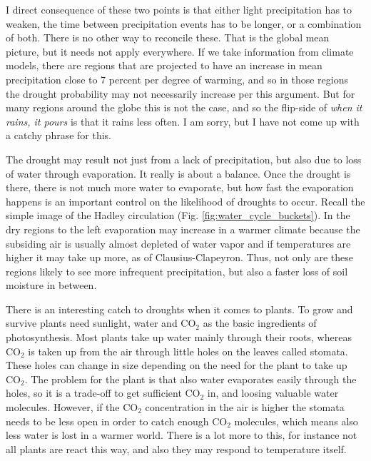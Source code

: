 \documentclass[12pt]{book}
\begin{document}
I direct consequence of these two points is that either light precipitation has to weaken, the time between precipitation events has to be longer, or a combination of both. There is no other way to reconcile these. That is the global mean picture, but it needs not apply everywhere. If we take information from climate models, there are regions that are projected to have an increase in mean precipitation close to 7 percent per degree of warming, and so in those regions the drought probability may not necessarily increase per this argument. But for many regions around the globe this is not the case, and so the flip-side of {\em when it rains, it pours} is that it rains less often. I am sorry, but I have not come up with a catchy phrase for this.

The drought may result not just from a lack of precipitation, but also due to loss of water through evaporation. It really is about a balance. Once the drought is there, there is not much more water to evaporate, but how fast the evaporation happens is an important control on the likelihood of droughts to occur. Recall the simple image of the Hadley circulation (Fig. \ref{fig:water_cycle_buckets}). In the dry regions to the left evaporation may increase in a warmer climate because the subsiding air is usually almost depleted of water vapor and if temperatures are higher it may take up more, as of Clausius-Clapeyron. Thus, not only are these regions likely to see more infrequent precipitation, but also a faster loss of soil moisture in between. 


There is an interesting catch to droughts when it comes to plants. To grow and survive plants need sunlight, water and CO$_2$ as the basic ingredients of photosynthesis. Most plants take up water mainly through their roots, whereas CO$_2$ is taken up from the air through little holes on the leaves called stomata. These holes can change in size depending on the need for the plant to take up CO$_2$. The problem for the plant is that also water evaporates easily through the holes, so it is a trade-off to get sufficient CO$_2$ in, and loosing valuable water molecules. However, if the CO$_2$ concentration in the air is higher the stomata needs to be less open in order to catch enough CO$_2$ molecules, which means also less water is lost in a warmer world. There is a lot more to this, for instance not all plants are react this way, and also they may respond to temperature itself. 
 
\end{document}
